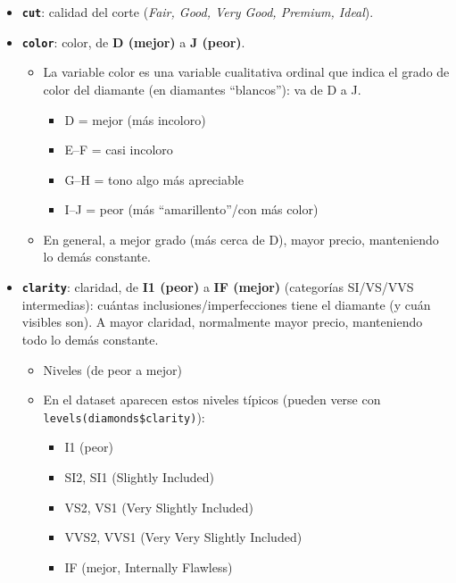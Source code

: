 \documentclass[
  spanish,
]{article}
\providecommand{\tightlist}{%
  \setlength{\itemsep}{0pt}\setlength{\parskip}{0pt}}
\begin{document}
\begin{itemize}
\tightlist
\item
  \textbf{\texttt{cut}}: calidad del corte (\emph{Fair, Good, Very Good,
  Premium, Ideal}).
\item
  \textbf{\texttt{color}}: color, de \textbf{D (mejor)} a \textbf{J
  (peor)}.

  \begin{itemize}
  \tightlist
  \item
    La variable color es una variable cualitativa ordinal que indica el
    grado de color del diamante (en diamantes ``blancos''): va de D a J.

    \begin{itemize}
    \tightlist
    \item
      D = mejor (más incoloro)
    \item
      E--F = casi incoloro
    \item
      G--H = tono algo más apreciable
    \item
      I--J = peor (más ``amarillento''/con más color)
    \end{itemize}
  \item
    En general, a mejor grado (más cerca de D), mayor precio,
    manteniendo lo demás constante.
  \end{itemize}
\item
  \textbf{\texttt{clarity}}: claridad, de \textbf{I1 (peor)} a
  \textbf{IF (mejor)} (categorías SI/VS/VVS intermedias): cuántas
  inclusiones/imperfecciones tiene el diamante (y cuán visibles son). A
  mayor claridad, normalmente mayor precio, manteniendo todo lo demás
  constante.

  \begin{itemize}
  \tightlist
  \item
    Niveles (de peor a mejor)
  \item
    En el dataset aparecen estos niveles típicos (pueden verse con
    \texttt{levels(diamonds\$clarity)}):

    \begin{itemize}
    \tightlist
    \item
      I1 (peor)
    \item
      SI2, SI1 (Slightly Included)
    \item
      VS2, VS1 (Very Slightly Included)
    \item
      VVS2, VVS1 (Very Very Slightly Included)
    \item
      IF (mejor, Internally Flawless)
    \end{itemize}
  \end{itemize}
\end{itemize}
\end{document}
